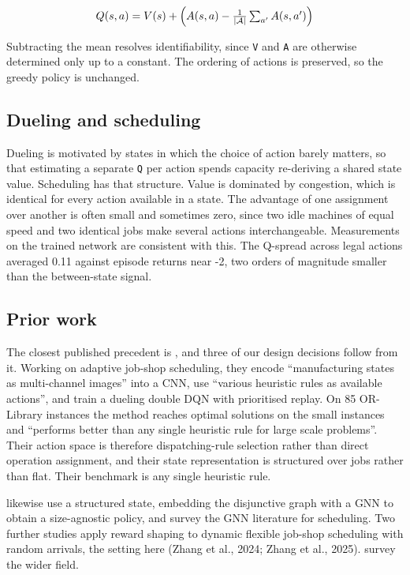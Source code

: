 \[
Q(s,a) = V(s) + \Bigl( A(s,a) - \tfrac{1}{|\mathcal{A}|}\textstyle\sum_{a'} A(s,a') \Bigr)
\]

Subtracting the mean resolves identifiability, since \texttt{V} and \texttt{A} are otherwise determined only up to
a constant. The ordering of actions is preserved, so the greedy policy is unchanged.

\subsection{Dueling and scheduling}\label{why-dueling-suits-scheduling-specifically}

Dueling is motivated by states in which the choice of action barely matters, so that estimating a
separate \texttt{Q} per action spends capacity re-deriving a shared state value. Scheduling has that
structure. Value is dominated by congestion, which is identical for every action available in a
state. The advantage of one assignment over another is often small and sometimes zero, since two
idle machines of equal speed and two identical jobs make several actions interchangeable. Measurements on the trained network are consistent with this. The Q-spread across legal actions averaged 0.11 against episode
returns near -2, two orders of magnitude smaller than the between-state signal.

\subsection{Prior work}\label{prior-work-in-the-domain}

The closest published precedent is \citet{hanyang2020}, and three of our design decisions follow
from it. Working on adaptive job-shop scheduling, they encode ``manufacturing states as
multi-channel images'' into a CNN, use ``various heuristic rules as available actions'', and train a
dueling double DQN with prioritised replay. On 85 OR-Library instances the method reaches optimal
solutions on the small instances and ``performs better than any single heuristic rule for large
scale problems''. Their action space is therefore dispatching-rule selection rather
than direct operation assignment, and their state representation is structured over jobs rather
than flat. Their benchmark is any single heuristic rule.

\citet{zhang2020l2d} likewise use a structured state, embedding the disjunctive graph with a GNN
to obtain a size-agnostic policy, and \citet{smit2024gnn} survey the
GNN literature for scheduling. Two further studies apply reward shaping to dynamic flexible
job-shop scheduling with random arrivals, the setting here (Zhang et al., 2024; Zhang et al.,
2025). \citet{lv2025review} survey the wider field.

